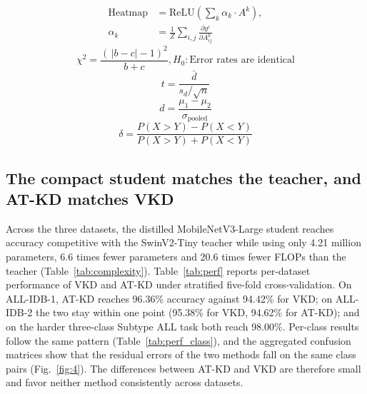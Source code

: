 \documentclass[preprint,review,12pt]{elsarticle}
\begin{document}
\begin{equation}\label{eq:19}
\begin{aligned}
\text{Heatmap} &= \text{ReLU}\!\left( \sum_{k}\alpha_{k} \cdot A^{k} \right), \\
\alpha_{k} &= \frac{1}{Z}\sum_{i,j}\frac{\partial y^{c}}{\partial A_{ij}^{k}}
\end{aligned}
\end{equation}
\begin{equation}\label{eq:20}
\chi^{2} = \frac{(\,|b-c|-1)^{2}}{b + c},H_{0}: \text{Error rates are identical}
\end{equation}
\begin{equation}\label{eq:21}
t = \frac{\bar{d}}{s_{d}/\sqrt{n}}
\end{equation}
\begin{equation}\label{eq:22}
d = \frac{\mu_{1} - \mu_{2}}{\sigma_{\text{pooled}}}
\end{equation}
\begin{equation}\label{eq:23}
\delta = \frac{P(X > Y) - P(X < Y)}{P(X > Y) + P(X < Y)}
\end{equation}

\subsection{The compact student matches the teacher, and AT-KD matches VKD}

Across the three datasets, the distilled MobileNetV3-Large student
reaches accuracy competitive with the SwinV2-Tiny teacher while using
only 4.21 million parameters, 6.6 times fewer parameters and 20.6 times
fewer FLOPs than the teacher (Table~\ref{tab:complexity}).
Table~\ref{tab:perf} reports per-dataset performance of VKD and AT-KD
under stratified five-fold cross-validation. On ALL-IDB-1, AT-KD reaches
96.36\% accuracy against 94.42\% for VKD; on ALL-IDB-2 the two stay
within one point (95.38\% for VKD, 94.62\% for AT-KD); and on the harder
three-class Subtype ALL task both reach 98.00\%. Per-class results follow
the same pattern (Table~\ref{tab:perf_class}), and the aggregated
confusion matrices show that the residual errors of the two methods fall
on the same class pairs (Fig.~\ref{fig:4}). The differences between AT-KD
and VKD are therefore small and favor neither method consistently across
datasets.
\end{document}
